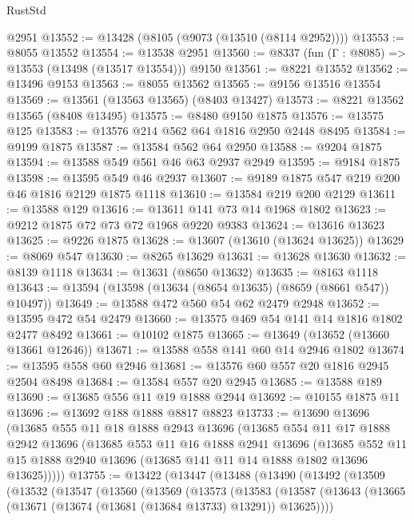 \begin{lexlean}{RustStd}
\begin{coremodule}
    @2951
@13552 := @13428 (@8105 (@9073 (@13510 (@8114 @2952))))
@13553 := @8055 @13552
@13554 := @13538 @2951
@13560 := @8337 (fun (Γ : @8085) => @13553 (@13498 (@13517 @13554))) @9150
@13561 := @8221 @13552
@13562 := @13496 @9153
@13563 := @8055 @13562
@13565 := @9156 @13516 @13554
@13569 := @13561 (@13563 @13565) (@8403 @13427)
@13573 := @8221 @13562 @13565 (@8408 @13495)
@13575 := @8480 @9150 @1875
@13576 := @13575 @125
@13583 := @13576 @214 @562 @64 @1816 @2950 @2448 @8495
@13584 := @9199 @1875
@13587 := @13584 @562 @64 @2950
@13588 := @9204 @1875
@13594 := @13588 @549 @561 @46 @63 @2937 @2949
@13595 := @9184 @1875
@13598 := @13595 @549 @46 @2937
@13607 := @9189 @1875 @547 @219 @200 @46 @1816 @2129 @1875 @1118
@13610 := @13584 @219 @200 @2129
@13611 := @13588 @129
@13616 := @13611 @141 @73 @14 @1968 @1802
@13623 := @9212 @1875 @72 @73 @72 @1968 @9220 @9383
@13624 := @13616 @13623
@13625 := @9226 @1875
@13628 := @13607 (@13610 (@13624 @13625))
@13629 := @8069 @547
@13630 := @8265 @13629
@13631 := @13628 @13630
@13632 := @8139 @1118
@13634 := @13631 (@8650 @13632)
@13635 := @8163 @1118
@13643 := @13594 (@13598 (@13634 (@8654 @13635) (@8659 (@8661 @547)) @10497))
@13649 := @13588 @472 @560 @54 @62 @2479 @2948
@13652 := @13595 @472 @54 @2479
@13660 := @13575 @469 @54 @141 @14 @1816 @1802 @2477 @8492
@13661 := @10102 @1875
@13665 := @13649 (@13652 (@13660 @13661 @12646))
@13671 := @13588 @558 @141 @60 @14 @2946 @1802
@13674 := @13595 @558 @60 @2946
@13681 := @13576 @60 @557 @20 @1816 @2945 @2504 @8498
@13684 := @13584 @557 @20 @2945
@13685 := @13588 @189
@13690 := @13685 @556 @11 @19 @1888 @2944
@13692 := @10155 @1875 @11
@13696 := @13692 @188 @1888 @8817 @8823
@13733 := @13690
    @13696
    (@13685
      @555
      @11
      @18
      @1888
      @2943
      @13696
      (@13685
        @554
        @11
        @17
        @1888
        @2942
        @13696
        (@13685
          @553
          @11
          @16
          @1888
          @2941
          @13696
          (@13685
            @552
            @11
            @15
            @1888
            @2940
            @13696
            (@13685 @141 @11 @14 @1888 @1802 @13696 @13625)))))
@13755 := @13422
    (@13447
      (@13488
        (@13490
          (@13492
            (@13509
              (@13532
                (@13547
                  (@13560
                    (@13569
                      (@13573
                        (@13583
                          (@13587
                            (@13643
                              (@13665 (@13671 (@13674 (@13681 (@13684 @13733) @13291)) @13625))))

\end{coremodule}
\end{lexlean}
